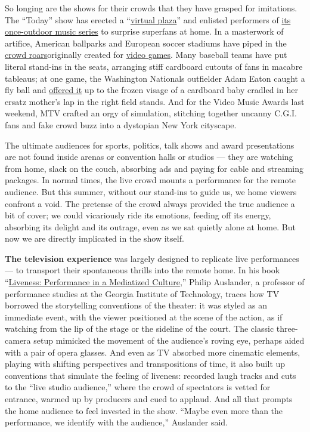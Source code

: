 So longing are the shows for their crowds that they have grasped for
imitations. The ``Today'' show has erected a
``\href{https://www.today.com/allday/join-today-s-virtual-plaza-t180466}{virtual
plaza}'' and enlisted performers of
\href{https://www.today.com/music-series}{its once-outdoor music series}
to surprise superfans at home. In a masterwork of artifice, American
ballparks and European soccer stadiums have piped in the
\href{https://www.espn.com/mlb/story/_/id/29477550/mlb-parks-use-crowd-noise-mlb-show-games}{crowd
roars}originally created for
\href{https://www.nytimes3xbfgragh.onion/2020/06/16/sports/coronavirus-stadium-fans-crowd-noise.html}{video
games}. Many baseball teams have put literal stand-ins in the seats,
arranging stiff cardboard cutouts of fans in macabre tableaus; at one
game, the Washington Nationals outfielder Adam Eaton caught a fly ball
and
\href{http://dcsportsking.com/2020/08/17/watch-adam-eaton-give-baseball-to-cutout-baby/}{offered
it} up to the frozen visage of a cardboard baby cradled in her ersatz
mother's lap in the right field stands. And for the Video Music Awards
last weekend, MTV crafted an orgy of simulation, stitching together
uncanny C.G.I. fans and fake crowd buzz into a dystopian New York
cityscape.

The ultimate audiences for sports, politics, talk shows and award
presentations are not found inside arenas or convention halls or studios
--- they are watching from home, slack on the couch, absorbing ads and
paying for cable and streaming packages. In normal times, the live crowd
mounts a performance for the remote audience. But this summer, without
our stand-ins to guide us, we home viewers confront a void. The pretense
of the crowd always provided the true audience a bit of cover; we could
vicariously ride its emotions, feeding off its energy, absorbing its
delight and its outrage, even as we sat quietly alone at home. But now
we are directly implicated in the show itself.

\textbf{The television experience} was largely designed to replicate
live performances --- to transport their spontaneous thrills into the
remote home. In his book
``\href{https://auslander.lmc.gatech.edu/liveness-performance-in-a-mediatized-culture-1999/}{Liveness:
Performance in a Mediatized Culture},'' Philip Auslander, a professor of
performance studies at the Georgia Institute of Technology, traces how
TV borrowed the storytelling conventions of the theater: it was styled
as an immediate event, with the viewer positioned at the scene of the
action, as if watching from the lip of the stage or the sideline of the
court. The classic three-camera setup mimicked the movement of the
audience's roving eye, perhaps aided with a pair of opera glasses. And
even as TV absorbed more cinematic elements, playing with shifting
perspectives and transpositions of time, it also built up conventions
that simulate the feeling of liveness: recorded laugh tracks and cuts to
the ``live studio audience,'' where the crowd of spectators is vetted
for entrance, warmed up by producers and cued to applaud. And all that
prompts the home audience to feel invested in the show. ``Maybe even
more than the performance, we identify with the audience,'' Auslander
said.

